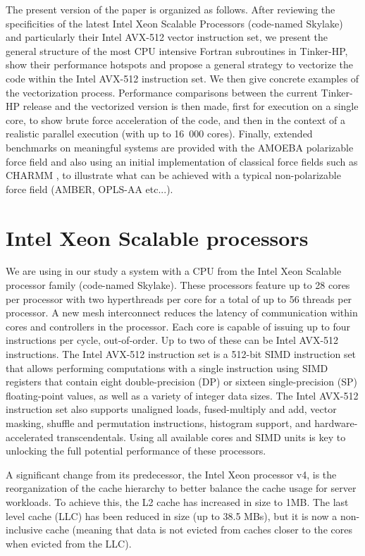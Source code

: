 \documentclass[9pt,comparison]{livecoms}
\begin{document}
The present version of the paper is organized as follows. After reviewing the specificities of the latest Intel Xeon Scalable Processors (code-named Skylake) and particularly their Intel AVX-512 vector instruction set, we present the general structure of the most CPU intensive Fortran subroutines in Tinker-HP, show their performance hotspots and propose a general strategy to vectorize the code within the Intel AVX-512 instruction set. We then give concrete examples of the vectorization process. Performance comparisons between the current Tinker-HP release and the vectorized version is then made, first for execution on a single core, to show brute force acceleration of the code, and then in the context of a realistic parallel execution (with up to 16~000 cores). Finally, extended benchmarks on meaningful systems are provided with the AMOEBA polarizable force field \cite{ren2003polarizable,shi2013polarizable,zhang2018amoeba} and also using an initial implementation of classical force fields such as CHARMM \cite{Charmm}, to illustrate what can be achieved with a typical non-polarizable force field (AMBER,\cite{Amber} OPLS-AA\cite{jorgensen1996development} etc...).
\section{Intel Xeon Scalable processors}
\hspace{\parindent}We are using in our study a system with a CPU from the Intel Xeon Scalable processor family (code-named Skylake). These processors feature up to 28 cores per processor with two hyperthreads per core for a total of up to 56 threads per processor. A new mesh interconnect reduces the latency of communication within cores and controllers in the processor. Each core is capable of issuing up to four instructions per cycle, out-of-order. Up to two of these can be Intel AVX-512 instructions\cite{intel-avx512}. The Intel AVX-512 instruction set is a 512-bit SIMD instruction set that allows performing computations with a single instruction using SIMD registers that contain eight double-precision (DP) or sixteen single-precision (SP) floating-point values, as well as a variety of integer data sizes. The Intel AVX-512 instruction set also supports unaligned loads, fused-multiply and add, vector masking, shuffle and permutation instructions, histogram support, and hardware-accelerated transcendentals. Using all available cores and SIMD units is key to unlocking the full potential performance of these processors.

A significant change from its predecessor, the Intel Xeon processor v4, is the reorganization of the cache hierarchy to better balance the cache usage for server workloads. To achieve this, the L2 cache has increased in size to 1MB. The last level cache (LLC) has been reduced in size (up to 38.5 MBs), but it is now a non-inclusive cache (meaning that data is not evicted from caches closer to the cores when evicted from the LLC).
\end{document}
